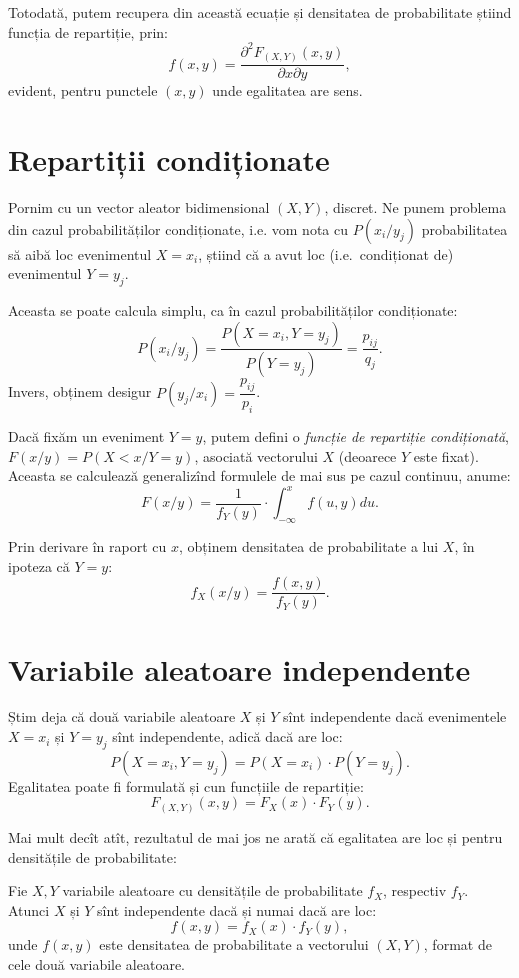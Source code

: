 Totodată, putem recupera din această ecuație și densitatea de probabilitate
știind funcția de repartiție, prin:
\[
  f(x, y) = \dfrac{\partial^2 F_{(X, Y)}(x, y)}{\partial x \partial y},
\]
evident, pentru punctele $ (x, y) $ unde egalitatea are sens.

\section{Repartiții condiționate}

Pornim cu un vector aleator bidimensional $ (X, Y) $, discret.
Ne punem problema din cazul probabilităților condiționate, i.e. vom nota
cu $ P(x_i/y_j) $ probabilitatea să aibă loc evenimentul $ X = x_i $,
știind că a avut loc (i.e.\ condiționat de) evenimentul $ Y = y_j $.

Aceasta se poate calcula simplu, ca în cazul probabilităților condiționate:
\[
  P(x_i / y_j) = \dfrac{P(X = x_i, Y = y_j)}{P(Y = y_j)} = \dfrac{p_{ij}}{q_j}.
\]
Invers, obținem desigur $ P(y_j / x_i) = \dfrac{p_{ij}}{p_i} $.

Dacă fixăm un eveniment $ Y = y $, putem defini o \emph{funcție de repartiție %
  condiționată}, $ F(x/y) = P(X < x / Y = y) $, asociată vectorului $ X $
(deoarece $ Y $ este fixat). Aceasta se calculează generalizînd formulele de
mai sus pe cazul continuu, anume:
\[
  F(x/y) = \dfrac{1}{f_Y(y)} \cdot \int_{-\infty}^x f(u, y) du.
\]

Prin derivare în raport cu $ x $, obținem densitatea de probabilitate a
lui $ X $, în ipoteza că $ Y = y $:
\[
  f_X(x/y) = \dfrac{f(x, y)}{f_Y(y)}.
\]

\section{Variabile aleatoare independente}

Știm deja că două variabile aleatoare $ X $ și $ Y $ sînt independente
dacă evenimentele $ X = x_i $ și $ Y = y_j $ sînt independente,
adică dacă are loc:
\[
  P(X = x_i, Y = y_j) = P(X = x_i) \cdot P(Y = y_j).
\]
Egalitatea poate fi formulată și cun funcțiile de repartiție:
\[
  F_{(X, Y)}(x, y) = F_X(x) \cdot F_Y(y).
\]

Mai mult decît atît, rezultatul de mai jos ne arată că egalitatea are
loc și pentru densitățile de probabilitate:

\begin{theorem}\label{thm:indep}
  Fie $ X, Y $ variabile aleatoare cu densitățile de probabilitate
  $ f_X $, respectiv $ f_Y $. Atunci $ X $ și $ Y $ sînt independente
  dacă și numai dacă are loc:
  \[
    f(x, y) = f_X(x) \cdot f_Y(y),
  \]
  unde $ f(x, y) $ este densitatea de probabilitate a vectorului $ (X, Y) $,
  format de cele două variabile aleatoare.
\end{theorem}

